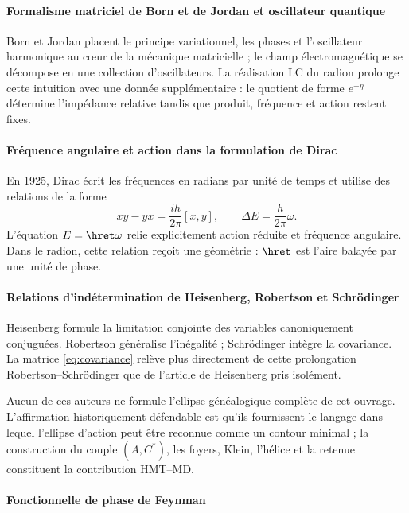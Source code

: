 \paragraph{Formalisme matriciel de Born et de Jordan et oscillateur quantique}

Born et Jordan placent le principe variationnel, les phases et l'oscillateur
harmonique au cœur de la mécanique matricielle ; le champ électromagnétique se
décompose en une collection d'oscillateurs. La réalisation LC du radion
prolonge cette intuition avec une donnée supplémentaire : le quotient de forme
\(e^{-\eta}\) détermine l'impédance relative tandis que produit, fréquence
et action restent fixes.

\paragraph{Fréquence angulaire et action dans la formulation de Dirac}

En 1925, Dirac écrit les fréquences en radians par unité de temps et utilise
des relations de la forme
\[
xy-yx=\frac{ih}{2\pi}[x,y],
\qquad
\Delta E=\frac{h}{2\pi}\omega.
\]
L'équation \(E=\hret\omega\) relie explicitement action réduite et
fréquence angulaire. Dans le radion, cette relation reçoit une géométrie : \(\hret\)
est l'aire balayée par une unité de phase.

\paragraph{Relations d'indétermination de Heisenberg, Robertson et Schrödinger}

Heisenberg formule la limitation conjointe des variables canoniquement
conjuguées. Robertson généralise l'inégalité ; Schrödinger intègre la
covariance. La matrice \eqref{eq:covariance} relève plus directement de cette
prolongation Robertson--Schrödinger que de l'article de Heisenberg pris isolément.

Aucun de ces auteurs ne formule l'ellipse généalogique complète de cet ouvrage.
L'affirmation historiquement défendable est qu'ils fournissent le langage dans
lequel l'ellipse d'action peut être reconnue comme un contour minimal ; la
construction du couple \((A,C^*)\), les foyers, Klein, l'hélice et la retenue constituent la
contribution HMT--MD.

\paragraph{Fonctionnelle de phase de Feynman}

